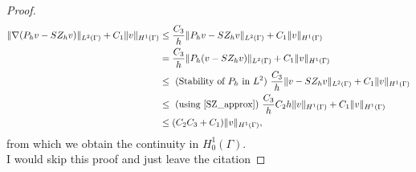 \begin{proof}
\begin{equation*}
\begin{split}
\|\nabla (P_h v - SZ_h v)\|_{L^2(\Gamma)} + C_1\|v\|_{H^1(\Gamma)}
&\leq \frac{C_3}{h} \|P_h v - SZ_h v\|_{L^2(\Gamma)} + C_1\|v\|_{H^1(\Gamma)}\\
&= \frac{C_3}{h} \|P_h (v - SZ_h v)\|_{L^2(\Gamma)} + C_1\|v\|_{H^1(\Gamma)}\\
&\leq  \text{ (Stability of $P_h$ in $L^2$) } \frac{C_3}{h} \|v - SZ_h v\|_{L^2(\Gamma)} + C_1\|v\|_{H^1(\Gamma)}\\
&\leq \text{ (using \eqref{SZ_approx}) } \frac{C_3}{h} C_2 h  \| v\|_{H^1(\Gamma)} + C_1\|v\|_{H^1(\Gamma)}\\
&\leq (C_2 C_3 +C_1) \|v\|_{H^1(\Gamma)},
\end{split}
\end{equation*}
from which we obtain the continuity in $H^1_0(\Gamma)$.\\
{\color{red} I would skip this proof and just leave the citation}
\end{proof}

